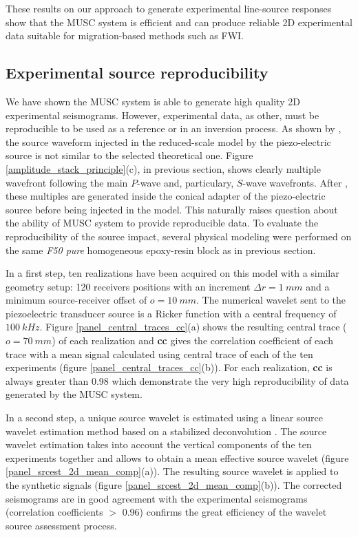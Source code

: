 \documentclass[manuscript,revised]{geophysics}
\begin{document}
\noindent These results on our approach to generate experimental line-source responses show that the MUSC system is efficient and can produce reliable 2D experimental data suitable for migration-based methods such as FWI.


\subsection{Experimental source reproducibility}

\noindent We have shown the MUSC system is able to generate high quality 2D experimental seismograms. However, experimental data, as other, must be reproducible to be used as a reference or in an inversion process. As shown by \citet{Bretaudeau_SSM_2011}, the source waveform injected in the reduced-scale model by the piezo-electric source is not similar to the selected theoretical one. Figure \ref{amplitude_stack_principle}(c), in previous section, shows clearly multiple wavefront following the main $P$-wave and, particulary, $S$-wave wavefronts. After \citet{Bretaudeau_SSM_2011}, these multiples are generated inside the conical adapter of the piezo-electric source before being injected in the model. This naturally raises question about the ability of MUSC system to provide reproducible data. To evaluate the reproducibility of the source impact, several physical modeling were performed on the same \textit{F50 pure} homogeneous epoxy-resin block as in previous section. 

\noindent In a first step, ten realizations have been acquired on this model with a similar geometry setup: 120 receivers positions with an increment $\Delta r= 1\ mm$ and a minimum source-receiver offset of $o=10\ mm$. The numerical wavelet sent to the piezoelectric transducer source is a Ricker function with a central frequency of $100\ kHz$. Figure \ref{panel_central_traces_cc}(a) shows the resulting central trace ($o=70\ mm$) of each realization and \textbf{cc} gives the correlation coefficient of each trace with a mean signal calculated using central trace of each of the ten experiments (figure \ref{panel_central_traces_cc}(b)). For each realization, \textbf{cc} is always greater than 0.98 which demonstrate the very high reproducibility of data generated by the MUSC system.

\noindent In a second step, a unique source wavelet is estimated using a linear source wavelet estimation method based on a stabilized deconvolution \citep{Pratt_FWI_1999}. The source wavelet estimation takes into account the vertical components of the ten experiments together and allows to obtain a mean effective source wavelet (figure \ref{panel_srcest_2d_mean_comp}(a)). The resulting source wavelet is applied to the synthetic signals (figure \ref{panel_srcest_2d_mean_comp}(b)). The corrected seismograms are in good agreement with the experimental seismograms (correlation coefficients $\mathrm{>}$ 0.96) confirms the great efficiency of the wavelet source assessment process.  
\end{document}
